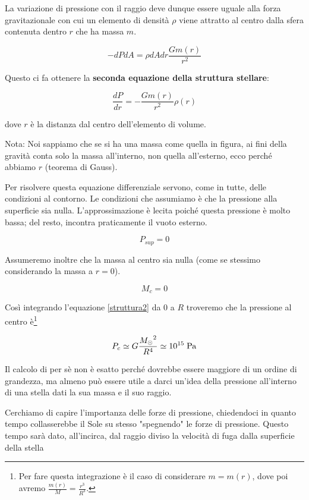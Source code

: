 La variazione di pressione con il raggio deve dunque essere uguale alla forza gravitazionale con cui un elemento di densità $\rho$ viene attratto al centro dalla sfera contenuta dentro $r$ che ha massa $m$.

\begin{equation*}
    -dPdA=\rho dAdr \frac{Gm(r)}{r^2}
\end{equation*}

Questo ci fa ottenere la \textbf{seconda equazione della struttura stellare}:

\begin{equation}
    \frac{dP}{dr}=-\frac{Gm(r)}{r^2}\rho(r)
    \label{struttura2}
\end{equation}

dove $r$ è la distanza dal centro dell'elemento di volume.

Nota: Noi sappiamo che se si ha una massa come quella in figura, ai fini della gravità conta solo la massa all'interno, non quella all'esterno, ecco perché abbiamo $r$ (teorema di Gauss).

Per risolvere questa equazione differenziale servono, come in tutte, delle condizioni al contorno. Le condizioni che assumiamo è che la pressione alla superficie sia nulla. L'approssimazione è lecita poiché questa pressione è molto bassa; del resto, incontra praticamente il vuoto esterno.

$$P_{sup}=0$$

Assumeremo inoltre che la massa al centro sia nulla (come se stessimo considerando la massa a $r=0$).

$$M_c=0$$

Così integrando l'equazione \ref{struttura2} da 0 a $R$ troveremo che la pressione al centro è\footnote{Per fare questa integrazione è il caso di considerare $m=m(r)$, dove poi avremo $\frac{m(r)}{M}=\frac{r^3}{R^3}$.}

$$P_c \simeq G \frac{{M_{\odot}}^2}{R^4}\simeq 10^{15} \; \rm Pa$$

Il calcolo di per sè non è esatto perché dovrebbe essere maggiore di un ordine di grandezza, ma almeno può essere utile a darci un'idea della pressione all'interno di una stella dati la sua massa e il suo raggio.

Cerchiamo di capire l'importanza delle forze di pressione, chiedendoci in quanto tempo collasserebbe il Sole su stesso "spegnendo" le forze di pressione. Questo tempo sarà dato, all'incirca, dal raggio diviso la velocità di fuga dalla superficie della stella

